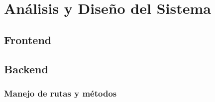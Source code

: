\chapter{Análisis y Diseño del Sistema}	

\section{Frontend}

\section{Backend}

\subsection{Manejo de rutas y m\'etodos}


